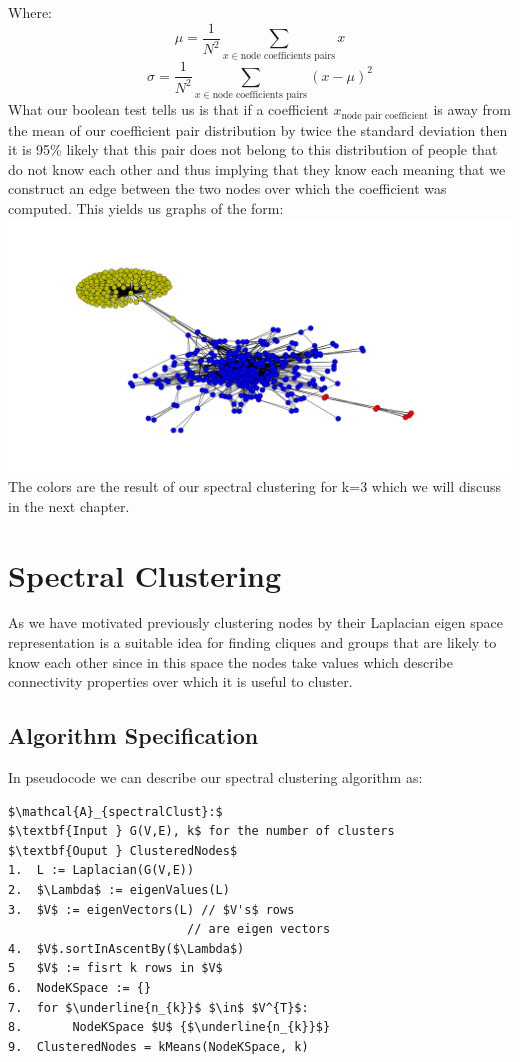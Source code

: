 \documentclass[10pt,twocolumn]{article}
\begin{document}
Where: $$\mu = \frac{1}{N^{2}}\sum_{x \in \text{node coefficients pairs} } x$$  $$\sigma = \frac{1}{N^{2}}\sum_{x \in \text{node coefficients pairs} } (x- \mu)^{2}$$
What our boolean test tells us is that if a coefficient $x_{\text{node pair coefficient}}$ is away from the mean of our coefficient pair distribution by twice the standard deviation then it is 95\%  likely that this pair does not belong to this distribution of people that do not know each other and thus implying that they know each meaning that we construct an edge between the two nodes over which the coefficient was computed. This yields us graphs of the form:
\hspace*{-2cm}
\includegraphics[scale=0.2]{pics/spring.png}
The colors are the result of our spectral clustering
for k=3 which we will discuss in the next chapter.
\section{Spectral Clustering}
As we have motivated previously clustering nodes by their Laplacian eigen space representation is a suitable idea for finding cliques and groups that are likely to know each other since in this space the nodes take values which describe connectivity properties over which it is useful to cluster.
\subsection{Algorithm Specification}
In pseudocode we can describe our spectral clustering algorithm as:
\begin{lstlisting}[mathescape]
$\mathcal{A}_{spectralClust}:$
$\textbf{Input } G(V,E), k$ for the number of clusters
$\textbf{Ouput } ClusteredNodes$
1.  L := Laplacian(G(V,E))
2.  $\Lambda$ := eigenValues(L)
3.  $V$ := eigenVectors(L) // $V's$ rows
                         // are eigen vectors
4.  $V$.sortInAscentBy($\Lambda$)
5   $V$ := fisrt k rows in $V$
6.  NodeKSpace := {}
7.  for $\underline{n_{k}}$ $\in$ $V^{T}$:
8.       NodeKSpace $U$ {$\underline{n_{k}}$}
9.  ClusteredNodes = kMeans(NodeKSpace, k)
\end{lstlisting}
\end{document}
